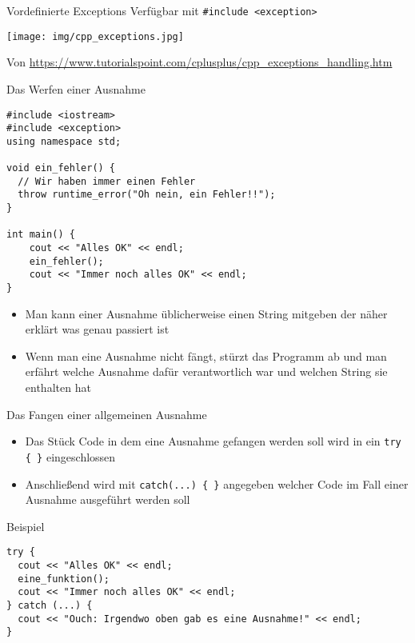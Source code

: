 \documentclass[presentation]{beamer}
\begin{document}
\begin{frame}[label={sec:orgcf5725e},fragile]{Vordefinierte Exceptions}
 Verfügbar mit {\color{solarizedYellow}\verb!#include <exception>!}
\begin{center}
\texttt{[image: img/cpp\_exceptions.jpg]}
\end{center}
\tiny
Von \url{https://www.tutorialspoint.com/cplusplus/cpp\_exceptions\_handling.htm}
\end{frame}
\begin{frame}[label={sec:orgdf65a9a},fragile]{Das Werfen einer Ausnahme}
 \begin{verbatim}
#include <iostream>
#include <exception>
using namespace std;

void ein_fehler() {
  // Wir haben immer einen Fehler
  throw runtime_error("Oh nein, ein Fehler!!");
}

int main() {
    cout << "Alles OK" << endl;
    ein_fehler();
    cout << "Immer noch alles OK" << endl;
}
\end{verbatim}
\begin{itemize}
\item Man kann einer Ausnahme üblicherweise einen \alert{String} mitgeben der
\alert{näher erklärt} was genau passiert ist
\item Wenn man eine \alert{Ausnahme nicht fängt}, \alert{stürzt das Programm ab} und
man erfährt welche Ausnahme dafür verantwortlich war und welchen
String sie enthalten hat
\end{itemize}
\end{frame}
\begin{frame}[label={sec:org6d8e106},fragile]{Das Fangen einer allgemeinen Ausnahme}
 \begin{itemize}
\item Das Stück Code in dem eine Ausnahme gefangen werden soll wird in ein
{\color{solarizedYellow}\verb!try { }!} eingeschlossen
\item Anschließend wird mit {\color{solarizedYellow}\verb!catch(...) { }!} angegeben \alert{welcher Code} im
Fall einer Ausnahme ausgeführt werden soll
\end{itemize}
\begin{block}{Beispiel}
\begin{verbatim}
try {
  cout << "Alles OK" << endl;
  eine_funktion();
  cout << "Immer noch alles OK" << endl;
} catch (...) {
  cout << "Ouch: Irgendwo oben gab es eine Ausnahme!" << endl;
}
\end{verbatim}
\end{block}
\end{frame}
\end{document}
